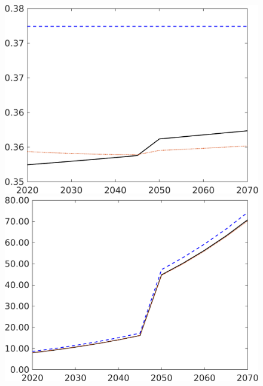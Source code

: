 \begin{figure}[h!!]
	\begin{minipage}[]{0.32\textwidth}
		\includegraphics[width=1\textwidth]{../../codding_model/own_basedOnFried/optimalPol_190722_tidiedUp/figures/all_10Aout22/hh_CompEffOPT_T_NoTaus_benchregime3_pol2_spillover0_noskill1_sep1_xgrowth1_PV1_etaa0.79_lgd0_lff0.png}
	\end{minipage}
	\begin{minipage}[]{0.32\textwidth}
		\includegraphics[width=1\textwidth]{../../codding_model/own_basedOnFried/optimalPol_190722_tidiedUp/figures/all_10Aout22/GFF_CompEffOPT_T_NoTaus_benchregime3_pol2_spillover0_noskill1_sep1_xgrowth1_PV1_etaa0.79_lgd0_lff0.png}

\end{minipage}
\end{figure}
